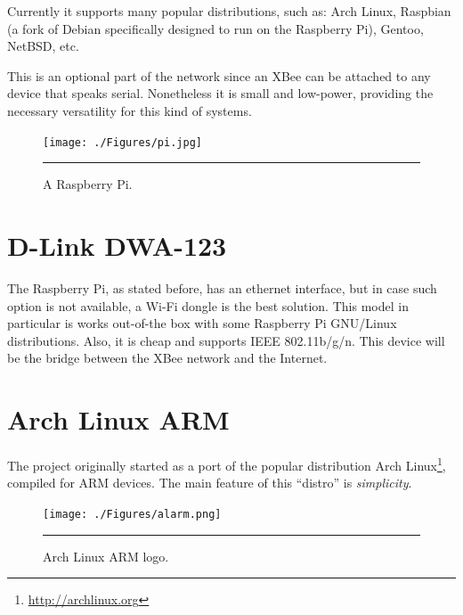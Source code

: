 Currently it supports many popular distributions, such as: Arch Linux, Raspbian (a fork of Debian specifically designed to run on the Raspberry Pi), Gentoo, NetBSD, etc.

This is an optional part of the network since an XBee can be attached to any device that speaks serial. Nonetheless it is small and low-power, providing the necessary versatility for this kind of systems.

\begin{figure}[htbp]
    \centering
    \texttt{[image: ./Figures/pi.jpg]}
        \rule{35em}{0.5pt}
        \caption[Raspberry Pi]{A Raspberry Pi.}
    \label{fig:RaspberryPi}
\end{figure}


\section{D-Link DWA-123}

The Raspberry Pi, as stated before, has an ethernet interface, but in case such option is not available, a Wi-Fi dongle is the best solution. This model in particular is works out-of-the box with some Raspberry Pi GNU/Linux distributions. Also, it is cheap and supports IEEE 802.11b/g/n. This device will be the bridge between the XBee network and the Internet.


\section{Arch Linux ARM}
\label{sec:alarmmm}

The project originally started as a port of the popular distribution Arch Linux\footnote{\url{http://archlinux.org}}, compiled for ARM devices. The main feature of this ``distro'' is \emph{simplicity}.

\begin{figure}[htbp]
    \centering
    \texttt{[image: ./Figures/alarm.png]}
        \rule{35em}{0.5pt}
        \caption[Arch Linux ARM Logo]{Arch Linux ARM logo.}
    \label{fig:alarm_logo}
\end{figure}


